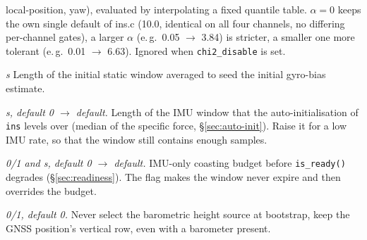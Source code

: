 \documentclass[11pt,a4paper]{article}
\newcommand{\code}[1]{\texttt{#1}}
\begin{document}
\begin{description}
    local-position, yaw), evaluated by interpolating a fixed quantile table.
    $\alpha=0$ keeps the own single default of ins.c (10.0, identical on all four
    channels, no differing per-channel gates), a larger
    $\alpha$ (e.\,g.\ 0.05 $\to$ 3.84) is stricter, a smaller one more tolerant
    (e.\,g.\ 0.01 $\to$ 6.63).
    Ignored when \code{chi2\_\allowbreak{}disable} is set.
  \item[\code{gyro\_\allowbreak{}bias\_\allowbreak{}window\_\allowbreak{}sec}] \emph{s} Length of the
    initial static window averaged to seed the initial gyro-bias estimate.
  \item[\code{auto\_\allowbreak{}init\_\allowbreak{}window\_\allowbreak{}sec}] \emph{s, default 0 $\to$ default.}
    Length of the IMU window that the auto-initialisation of \code{ins} levels
    over (median of the specific force, \S\ref{sec:auto-init}). Raise it for a
    low IMU rate, so that the window still contains enough samples.
  \item[\code{allow\_\allowbreak{}unlimited\_\allowbreak{}deadreckoning},
    \code{max\_\allowbreak{}deadreckoning\_\allowbreak{}sec}] \emph{0/1 and s, default 0 $\to$
    default.} IMU-only coasting budget before \code{is\_\allowbreak{}ready()} degrades
    (\S\ref{sec:readiness}). The flag makes the window never expire and
    then overrides the budget.
  \item[\code{baro\_\allowbreak{}height\_\allowbreak{}disable}] \emph{0/1, default 0.} Never select the
    barometric height source at bootstrap, keep the GNSS position's vertical
    row, even with a barometer present.
\end{description}
\end{document}
